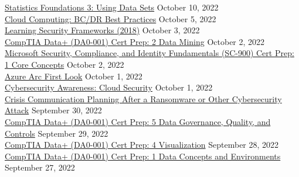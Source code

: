\documentclass[10pt]{res} %
\begin{document}
\begin{resume}
\href{https://www.linkedin.com/learning/certificates/62978685e6098fbf1921e04789f5c0514e3d80bc8002e47e30f12c87a3967934}{\color{blue}Statistics Foundations 3: Using Data Sets} \hfill October 10, 2022 \\
\href{https://www.linkedin.com/learning/certificates/9029319c5451372190cf06cc93565e33c360b865d161f886bb43ed86c2b4ea3b}{\color{blue}Cloud Computing: BC/DR Best Practices} \hfill October 5, 2022 \\
\href{https://www.linkedin.com/learning/certificates/130faa71cedfea0404a771d8d797ace1ee7f38e51746afe6d0d04cba0850d496}{\color{blue}Learning Security Frameworks (2018)} \hfill October 3, 2022 \\
\href{https://www.linkedin.com/learning/certificates/c54302b4efc9af744133dc50e9f80d18b95913a0b39e5d10c4e132416f2acf26}{\color{blue}CompTIA Data+ (DA0-001) Cert Prep: 2 Data Mining} \hfill October 2, 2022 \\
\href{https://www.linkedin.com/learning/certificates/1f182e53f6ad217fd334c9eb955d8627925ba83eaf72803ea769182f53c1947f}{\color{blue}Microsoft Security, Compliance, and Identity Fundamentals (SC-900) Cert Prep: 1 Core Concepts} \hfill October 2, 2022 \\
\href{https://www.linkedin.com/learning/certificates/aae02bd28f1899e06c42ab0d38768fb638e605744bf1ba69b8aaa97baeb2af4f}{\color{blue}Azure Arc First Look} \hfill October 1, 2022 \\
\href{https://www.linkedin.com/learning/certificates/73922d37fe7c9af1c903fb024d16585e78f5f46e356f49867fd809f2c4bbf308}{\color{blue}Cybersecurity Awareness: Cloud Security} \hfill October 1, 2022 \\
\href{https://www.linkedin.com/learning/certificates/5028b9cc899d91af0f1620139fd7d53c1a03e7999a7d4d2be31a7dd4ceb825ad}{\color{blue}Crisis Communication Planning After a Ransomware or Other Cybersecurity Attack} \hfill September 30, 2022 \\
\href{https://www.linkedin.com/learning/certificates/62aafe086ffcd90fa62cca5663701071963942930f99f0407183b8b01963221c}{\color{blue}CompTIA Data+ (DA0-001) Cert Prep: 5 Data Governance, Quality, and Controls} \hfill September 29, 2022 \\
\href{https://www.linkedin.com/learning/certificates/22ce4f27a0d933ca84ec8d9d5b5a400ed43c7946075596ccaa237d9fe0e5aeff}{\color{blue}CompTIA Data+ (DA0-001) Cert Prep: 4 Visualization} \hfill September 28, 2022 \\
\href{https://www.linkedin.com/learning/certificates/7b63c9ce09d596cb41e97290f7947d5b2ffd07ff6261b10706e96849397d6369}{\color{blue}CompTIA Data+ (DA0-001) Cert Prep: 1 Data Concepts and Environments} \hfill September 27, 2022 \\

\end{resume}
\end{document}
